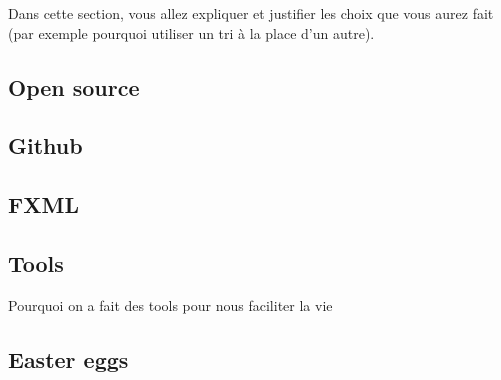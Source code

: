 \documentclass[../main.tex]{subfiles}
\begin{document}
Dans cette section, vous allez expliquer et justifier les choix que vous aurez fait (par exemple pourquoi utiliser un tri à la place d'un autre).

\subsection{Open source}

\subsection{Github}

\subsection{FXML}

\subsection{Tools}
Pourquoi on a fait des tools pour nous faciliter la vie

\subsection{Easter eggs}
\end{document}
